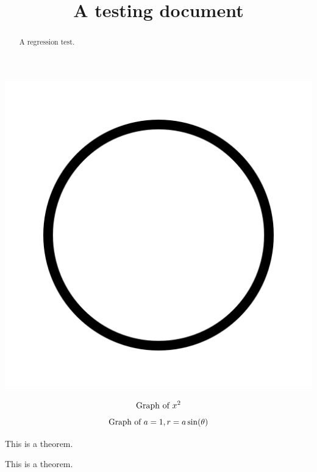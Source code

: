 \documentclass{ximera}
\title[Pretitle:]{A testing document}
\begin{document}
\begin{abstract}
  A regression test.
\end{abstract}
\maketitle


\begin{image}
\end{image}


\begin{image}
  \includegraphics{circle.png}
\end{image}


\[
\graph{x^2}
\]
\[
\graph[xmin=-2.5,xmax=2.5,ymin=-.5,ymax=1.5,polar]{a=1,r=a \sin(\theta)}
\]




\begin{theorem}
  This is a theorem.
\end{theorem}

\begin{theorem}[My theorem]
  This is a theorem.
\end{theorem}
\end{document}
